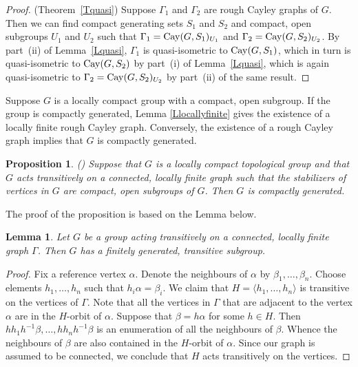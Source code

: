 \documentclass{emsprocart}
\newtheorem{lemma}[theorem]{Lemma}
\newtheorem{proposition}[theorem]{Proposition}
\theoremstyle{definition}
\begin{document}
\medskip

\begin{proof} (Theorem~\ref{Tquasi})  Suppose $\Gamma_1$ and
$\Gamma_2$ are rough Cayley graphs of $G$.  Then we can find compact
generating sets $S_1$ and $S_2$ and compact, open subgroups $U_1$ and
$U_2$ such that $\Gamma_1={\mbox{${\rm Cay}$}}(G, S_1)_{U_1}$ and
$\Gamma_2={\mbox{${\rm Cay}$}}(G, S_2)_{U_2}$.  By part~(ii) of Lemma~\ref{Lquasi}, $\Gamma_1$ is quasi-isometric to
	${\mbox{${\rm Cay}$}}(G, S_1)$, which in turn is quasi-isometric to  ${\mbox{${\rm Cay}$}}(G,
	S_2)$ by part~(i) of Lemma~\ref{Lquasi}, which is again
	quasi-isometric to $\Gamma_2={\mbox{${\rm Cay}$}}(G, S_2)_{U_2}$ 
by part~(ii) of the same result.
\end{proof}

Suppose $G$ is a locally compact group with a compact, open subgroup.
If the group is compactly generated, Lemma \ref{Llocallyfinite} gives
the existence of a locally finite rough Cayley graph. Conversely,
the existence of a rough Cayley graph implies that $G$ is compactly
generated.

\begin{proposition} {\rm (\cite[Corollary~1]{Moller2003})}
\label{Pcompactgenerated}
Suppose that $G$ is a locally compact topological group and that
$G$ acts transitively on a connected, locally finite graph such that
the stabilizers of vertices in $G$ are compact, open subgroups of $G$.
Then $G$ is compactly generated.
\end{proposition}

The proof of the proposition is based on the Lemma below.

\begin{lemma} \label{Ltransitive}
Let $G$ be a group acting transitively on a connected, locally finite
graph $\Gamma$.  Then $G$ has a finitely generated, transitive subgroup.
\end{lemma}

\noindent
\begin{proof} Fix a reference vertex $\alpha$.  Denote the neighbours
of $\alpha$ by $\beta_1, \ldots, \beta_n$.  Choose elements $h_1,
\ldots, h_n$ such that $h_i\alpha=\beta_i$.  We claim that
$H=\langle h_1, \ldots, h_n\rangle$ is transitive on the vertices of
$\Gamma$.   Note that all the vertices in $\Gamma$ that are adjacent
to the vertex $\alpha$ are in the $H$-orbit of $\alpha$.  Suppose that
$\beta=h\alpha$ for some $h\in H$.   Then $hh_1h^{-1}\beta, \ldots,
hh_nh^{-1}\beta$ is an enumeration of all the neighbours of $\beta$.
Whence the neighbours of $\beta$ are also contained in the $H$-orbit
of $\alpha$.  Since our graph is assumed to be connected, we conclude
that $H$ acts transitively on the vertices.      \end{proof}
\end{document}
